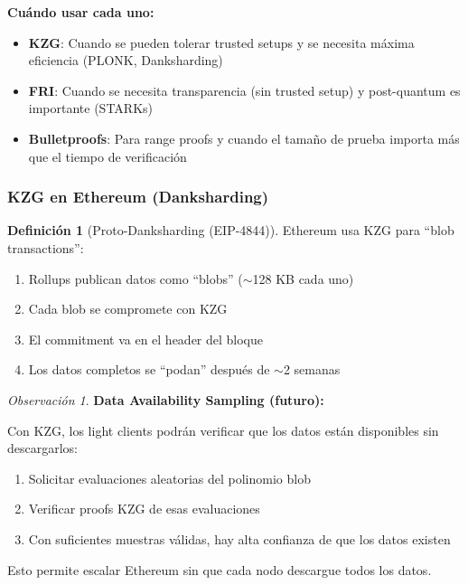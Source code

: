 \documentclass[11pt,a4paper,twoside,openright]{book}
\theoremstyle{definition}
\newtheorem{definition}{Definición}[chapter]
\theoremstyle{plain}
\theoremstyle{remark}
\newtheorem{remark}{Observación}[chapter]
\begin{document}
\begin{keyidea}
\textbf{Cuándo usar cada uno:}
\begin{itemize}
    \item \textbf{KZG}: Cuando se pueden tolerar trusted setups y se necesita máxima eficiencia (PLONK, Danksharding)
    \item \textbf{FRI}: Cuando se necesita transparencia (sin trusted setup) y post-quantum es importante (STARKs)
    \item \textbf{Bulletproofs}: Para range proofs y cuando el tamaño de prueba importa más que el tiempo de verificación
\end{itemize}
\end{keyidea}

\subsubsection{KZG en Ethereum (Danksharding)}

\begin{definition}[Proto-Danksharding (EIP-4844)]
Ethereum usa KZG para ``blob transactions'':
\begin{enumerate}
    \item Rollups publican datos como ``blobs'' ($\sim$128 KB cada uno)
    \item Cada blob se compromete con KZG
    \item El commitment va en el header del bloque
    \item Los datos completos se ``podan'' después de $\sim$2 semanas
\end{enumerate}
\end{definition}

\begin{remark}
\textbf{Data Availability Sampling (futuro):}

Con KZG, los light clients podrán verificar que los datos están disponibles sin descargarlos:
\begin{enumerate}
    \item Solicitar evaluaciones aleatorias del polinomio blob
    \item Verificar proofs KZG de esas evaluaciones
    \item Con suficientes muestras válidas, hay alta confianza de que los datos existen
\end{enumerate}

Esto permite escalar Ethereum sin que cada nodo descargue todos los datos.
\end{remark}
\end{document}
